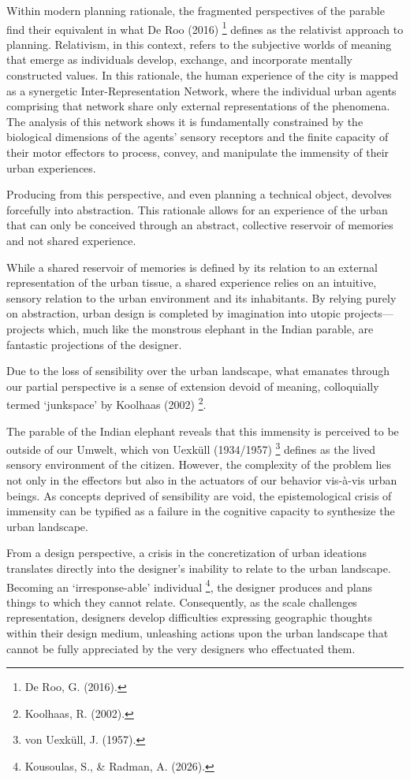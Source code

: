 \documentclass[
  letterpaper,
  DIV=11,
  numbers=noendperiod]{scrreprt}
\begin{document}
Within modern planning rationale, the fragmented perspectives of the
parable find their equivalent in what De Roo (2016) \footnote{De Roo, G.
  (2016).} defines as the relativist approach to planning. Relativism,
in this context, refers to the subjective worlds of meaning that emerge
as individuals develop, exchange, and incorporate mentally constructed
values. In this rationale, the human experience of the city is mapped as
a synergetic Inter-Representation Network, where the individual urban
agents comprising that network share only external representations of
the phenomena. The analysis of this network shows it is fundamentally
constrained by the biological dimensions of the agents' sensory
receptors and the finite capacity of their motor effectors to process,
convey, and manipulate the immensity of their urban experiences.

Producing from this perspective, and even planning a technical object,
devolves forcefully into abstraction. This rationale allows for an
experience of the urban that can only be conceived through an abstract,
collective reservoir of memories and not shared experience.

While a shared reservoir of memories is defined by its relation to an
external representation of the urban tissue, a shared experience relies
on an intuitive, sensory relation to the urban environment and its
inhabitants. By relying purely on abstraction, urban design is completed
by imagination into utopic projects---projects which, much like the
monstrous elephant in the Indian parable, are fantastic projections of
the designer.

Due to the loss of sensibility over the urban landscape, what emanates
through our partial perspective is a sense of extension devoid of
meaning, colloquially termed `junkspace' by Koolhaas (2002) \footnote{Koolhaas,
  R. (2002).}.

The parable of the Indian elephant reveals that this immensity is
perceived to be outside of our Umwelt, which von Uexküll (1934/1957)
\footnote{von Uexküll, J. (1957).} defines as the lived sensory
environment of the citizen. However, the complexity of the problem lies
not only in the effectors but also in the actuators of our behavior
vis-à-vis urban beings. As concepts deprived of sensibility are void,
the epistemological crisis of immensity can be typified as a failure in
the cognitive capacity to synthesize the urban landscape.

From a design perspective, a crisis in the concretization of urban
ideations translates directly into the designer's inability to relate to
the urban landscape. Becoming an `irresponse-able' individual
\footnote{Kousoulas, S., \& Radman, A. (2026).}, the designer produces
and plans things to which they cannot relate. Consequently, as the scale
challenges representation, designers develop difficulties expressing
geographic thoughts within their design medium, unleashing actions upon
the urban landscape that cannot be fully appreciated by the very
designers who effectuated them.
\end{document}
